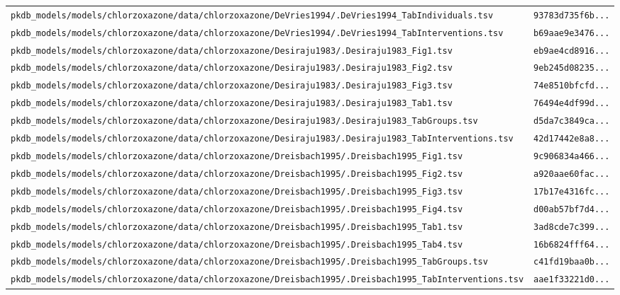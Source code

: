 \begin{longtable}{ll}
\texttt{pkdb\_models/models/chlorzoxazone/data/chlorzoxazone/DeVries1994/.DeVries1994\_TabIndividuals.tsv} & \texttt{93783d735f6b...} \\
\texttt{pkdb\_models/models/chlorzoxazone/data/chlorzoxazone/DeVries1994/.DeVries1994\_TabInterventions.tsv} & \texttt{b69aae9e3476...} \\
\texttt{pkdb\_models/models/chlorzoxazone/data/chlorzoxazone/Desiraju1983/.Desiraju1983\_Fig1.tsv} & \texttt{eb9ae4cd8916...} \\
\texttt{pkdb\_models/models/chlorzoxazone/data/chlorzoxazone/Desiraju1983/.Desiraju1983\_Fig2.tsv} & \texttt{9eb245d08235...} \\
\texttt{pkdb\_models/models/chlorzoxazone/data/chlorzoxazone/Desiraju1983/.Desiraju1983\_Fig3.tsv} & \texttt{74e8510bfcfd...} \\
\texttt{pkdb\_models/models/chlorzoxazone/data/chlorzoxazone/Desiraju1983/.Desiraju1983\_Tab1.tsv} & \texttt{76494e4df99d...} \\
\texttt{pkdb\_models/models/chlorzoxazone/data/chlorzoxazone/Desiraju1983/.Desiraju1983\_TabGroups.tsv} & \texttt{d5da7c3849ca...} \\
\texttt{pkdb\_models/models/chlorzoxazone/data/chlorzoxazone/Desiraju1983/.Desiraju1983\_TabInterventions.tsv} & \texttt{42d17442e8a8...} \\
\texttt{pkdb\_models/models/chlorzoxazone/data/chlorzoxazone/Dreisbach1995/.Dreisbach1995\_Fig1.tsv} & \texttt{9c906834a466...} \\
\texttt{pkdb\_models/models/chlorzoxazone/data/chlorzoxazone/Dreisbach1995/.Dreisbach1995\_Fig2.tsv} & \texttt{a920aae60fac...} \\
\texttt{pkdb\_models/models/chlorzoxazone/data/chlorzoxazone/Dreisbach1995/.Dreisbach1995\_Fig3.tsv} & \texttt{17b17e4316fc...} \\
\texttt{pkdb\_models/models/chlorzoxazone/data/chlorzoxazone/Dreisbach1995/.Dreisbach1995\_Fig4.tsv} & \texttt{d00ab57bf7d4...} \\
\texttt{pkdb\_models/models/chlorzoxazone/data/chlorzoxazone/Dreisbach1995/.Dreisbach1995\_Tab1.tsv} & \texttt{3ad8cde7c399...} \\
\texttt{pkdb\_models/models/chlorzoxazone/data/chlorzoxazone/Dreisbach1995/.Dreisbach1995\_Tab4.tsv} & \texttt{16b6824fff64...} \\
\texttt{pkdb\_models/models/chlorzoxazone/data/chlorzoxazone/Dreisbach1995/.Dreisbach1995\_TabGroups.tsv} & \texttt{c41fd19baa0b...} \\
\texttt{pkdb\_models/models/chlorzoxazone/data/chlorzoxazone/Dreisbach1995/.Dreisbach1995\_TabInterventions.tsv} & \texttt{aae1f33221d0...} \\

\end{longtable}
